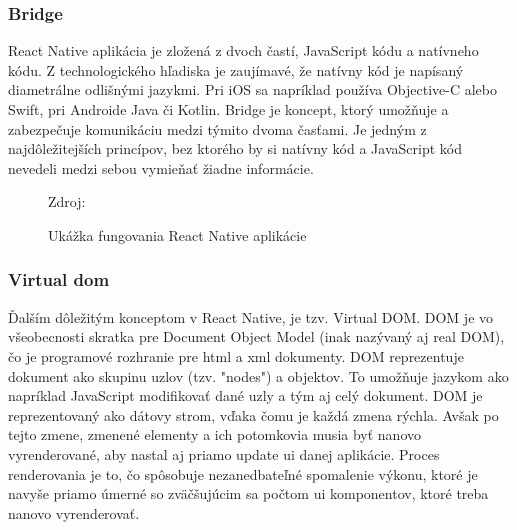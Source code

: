 \subsubsection{Bridge}
React Native aplikácia je zložená z dvoch častí, JavaScript kódu a natívneho kódu. Z technologického hľadiska je zaujímavé, že natívny kód je napísaný diametrálne odlišnými jazykmi. Pri iOS sa napríklad používa Objective-C alebo Swift, pri Androide Java či Kotlin. Bridge je koncept, ktorý umožňuje a zabezpečuje komunikáciu medzi týmito dvoma časťami. Je jedným z najdôležitejších princípov, bez ktorého by si natívny kód a JavaScript kód nevedeli medzi sebou vymieňať žiadne informácie. \cite{rn3}
\begin{figure}[!htbp]
  \centering  
  \def\stackalignment{c}
           {\scriptsize%
            Zdroj: \cite{udemy}}
	\caption{Ukážka fungovania React Native aplikácie}  
  \label{reactAppExplained}
\end{figure}
\subsubsection{Virtual \acrfull{dom}}
Ďalším dôležitým konceptom v React Native, je tzv. Virtual DOM. DOM je vo všeobecnosti skratka pre Document Object Model (inak nazývaný aj real DOM), čo je programové rozhranie pre \acrshort{html} a \acrshort{xml} dokumenty. DOM reprezentuje dokument ako skupinu uzlov (tzv. "nodes") a objektov. To umožňuje jazykom ako napríklad JavaScript modifikovať dané uzly a tým aj celý dokument. DOM je reprezentovaný ako dátovy strom, vďaka čomu je každá zmena rýchla. Avšak po tejto zmene, zmenené elementy a ich potomkovia musia byť nanovo vyrenderované, aby nastal aj priamo update \acrshort{ui} danej aplikácie. Proces renderovania je to, čo spôsobuje nezanedbateľné spomalenie výkonu, ktoré je navyše priamo úmerné so zväčšujúcim sa počtom \acrshort{ui} komponentov, ktoré treba nanovo vyrenderovať. 

